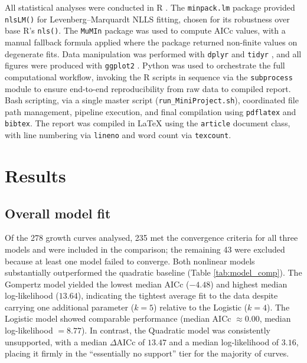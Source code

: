 \documentclass[11pt,a4paper]{article}
\begin{document}
All statistical analyses were conducted in R \citep{RCoreTeam}. The
\texttt{minpack.lm} package \citep{minpacklm} provided \texttt{nlsLM()}
for Levenberg--Marquardt NLLS fitting, chosen for its robustness over
base R's \texttt{nls()}. The \texttt{MuMIn} package \citep{MuMIn} was
used to compute AICc values, with a manual fallback formula applied where
the package returned non-finite values on degenerate fits. Data
manipulation was performed with \texttt{dplyr} and \texttt{tidyr}
\citep{tidyverse}, and all figures were produced with \texttt{ggplot2}
\citep{ggplot2}. Python was used to orchestrate the full computational
workflow, invoking the R scripts in sequence via the \texttt{subprocess}
module to ensure end-to-end reproducibility from raw data to compiled
report. Bash scripting, via a single master script
(\texttt{run\_MiniProject.sh}), coordinated file path management,
pipeline execution, and final compilation using \texttt{pdflatex} and
\texttt{bibtex}. The report was compiled in \LaTeX{} using the
\texttt{article} document class, with line numbering via \texttt{lineno}
and word count via \texttt{texcount}.

\section{Results}

\subsection{Overall model fit}

Of the 278 growth curves analysed, 235 met the convergence criteria for
all three models and were included in the comparison; the remaining 43
were excluded because at least one model failed to converge. Both
nonlinear models substantially outperformed the quadratic baseline (Table
\ref{tab:model_comp}). The Gompertz model yielded the lowest median
AICc ($-4.48$) and highest median log-likelihood ($13.64$), indicating
the tightest average fit to the data despite carrying one additional
parameter ($k = 5$) relative to the Logistic ($k = 4$). The Logistic
model showed comparable performance (median AICc $\approx 0.00$, median
log-likelihood $= 8.77$). In contrast, the Quadratic model was
consistently unsupported, with a median $\Delta\text{AICc}$ of $13.47$
and a median log-likelihood of $3.16$, placing it firmly in the
``essentially no support'' tier for the majority of curves.
\end{document}
